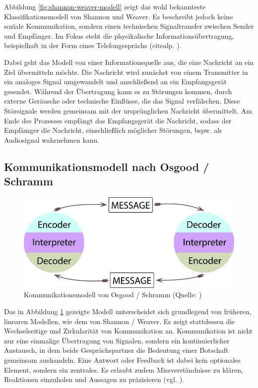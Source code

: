 Abbildung \ref{fig:shannon-weaver-modell} zeigt das wohl bekannteste Klassifikationsmodell von Shannon und Weaver. Es beschreibt jedoch keine soziale Kommunikation, sondern einen technischen Signaltransfer zwischen Sender und Empfänger. Im Fokus steht die physikalische Informationsübertragung, beispielhaft in der Form eines Telefongesprächs (citealp. \cite[S. 92]{scheufele_kommunikationstheorien_2004}). 

Dabei geht das Modell von einer Informationsquelle aus, die eine Nachricht an ein Ziel übermitteln möchte. Die Nachricht wird zunächst von einem Transmitter in ein analoges Signal umgewandelt und anschließend an ein Empfangsgerät gesendet. Während der Übertragung kann es zu Störungen kommen, durch externe Geräusche oder technische Einflüsse, die das Signal verfälschen. Diese Störsignale werden gemeinsam mit der ursprünglichen Nachricht übermittelt. Am Ende des Prozesses empfängt das Empfangsgerät die Nachricht, sodass der Empfämger die Nachricht, einschließlich möglicher Störungen, bspw. als Audiosignal wahrnehmen kann.

\subsection{Kommunikationsmodell nach Osgood / Schramm}

\begin{figure}[ht]
\centering
\includegraphics[width=1\linewidth]{content/pictures/osgood-schramm.jpg}
\caption{Kommunikationsmodell von Osgood / Schramm (Quelle: \cite{wrench_24_2021})}
\label{fig:osgood-schramm-modell}
\end{figure}

Das in Abbildung \ref{fig:osgood-schramm-modell} gezeigte Modell unterscheidet sich grundlegend von früheren, linearen Modellen, wie dem von Shannon / Weaver. Es zeigt stattdessen die Wechselseitige und Zirkularität von Kommunikation an. Kommunikation ist nicht nur eine einmalige Übertragung von Signalen, sondern ein kontinuierlicher Austausch, in dem beide Gesprächspartner die Bedeutung einer Botschaft gemeinsam aushandeln. Eine Antwort oder Feedback ist dabei kein optionales Element, sondern ein zentrales. Es erlaubt zudem Missverständnisse zu klären, Reaktionen einzuholen und Aussagen zu präzisieren (vgl. \cite{noauthor_osgood_2024}). 

